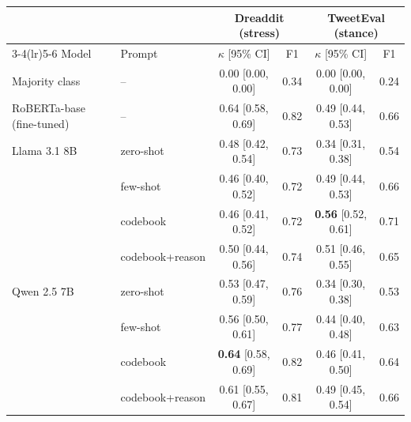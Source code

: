 \begin{tabular}{llcccc}
\toprule
 & & \multicolumn{2}{c}{Dreaddit (stress)} & \multicolumn{2}{c}{TweetEval (stance)} \\
\cmidrule(lr){3-4}\cmidrule(lr){5-6}
Model & Prompt & $\kappa$ [95\% CI] & F1 & $\kappa$ [95\% CI] & F1 \\
\midrule
Majority class & -- & 0.00 [0.00, 0.00] & 0.34 & 0.00 [0.00, 0.00] & 0.24 \\
RoBERTa-base (fine-tuned) & -- & 0.64 [0.58, 0.69] & 0.82 & 0.49 [0.44, 0.53] & 0.66 \\
\midrule
Llama 3.1 8B & zero-shot & 0.48 [0.42, 0.54] & 0.73 & 0.34 [0.31, 0.38] & 0.54 \\
 & few-shot & 0.46 [0.40, 0.52] & 0.72 & 0.49 [0.44, 0.53] & 0.66 \\
 & codebook & 0.46 [0.41, 0.52] & 0.72 & \textbf{0.56} [0.52, 0.61] & 0.71 \\
 & codebook+reason & 0.50 [0.44, 0.56] & 0.74 & 0.51 [0.46, 0.55] & 0.65 \\
\midrule
Qwen 2.5 7B & zero-shot & 0.53 [0.47, 0.59] & 0.76 & 0.34 [0.30, 0.38] & 0.53 \\
 & few-shot & 0.56 [0.50, 0.61] & 0.77 & 0.44 [0.40, 0.48] & 0.63 \\
 & codebook & \textbf{0.64} [0.58, 0.69] & 0.82 & 0.46 [0.41, 0.50] & 0.64 \\
 & codebook+reason & 0.61 [0.55, 0.67] & 0.81 & 0.49 [0.45, 0.54] & 0.66 \\
\bottomrule
\end{tabular}
